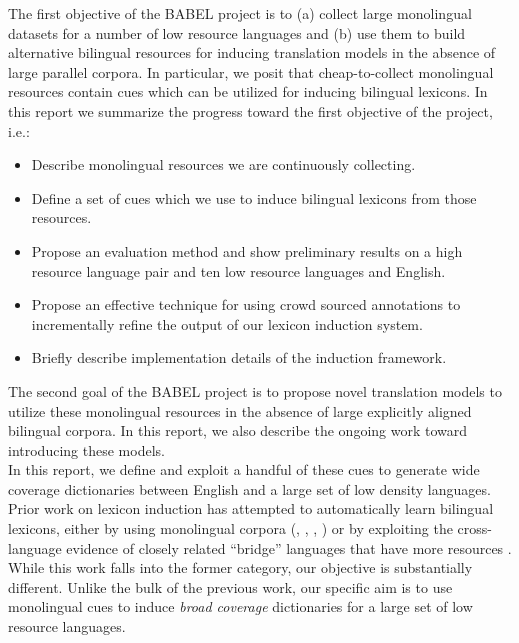 \documentclass{article}
\begin{document}
The first objective of the BABEL project is to (a) collect large monolingual datasets for a number of low resource languages and (b) use them to build alternative bilingual resources for inducing translation models in the absence of large parallel corpora.  In particular, we posit that cheap-to-collect monolingual resources contain cues which can be utilized for inducing bilingual lexicons. In this report we summarize the progress toward the first objective of the project, i.e.:

\begin{itemize}
 \item Describe monolingual resources we are continuously collecting.
 \item Define a set of cues which we use to induce bilingual lexicons from those resources.
 \item Propose an evaluation method and show preliminary results on a high resource language pair and ten low resource languages and English.
 \item Propose an effective technique for using crowd sourced annotations to incrementally refine the output of our lexicon induction system.
 \item Briefly describe implementation details of the induction framework.
\end{itemize}

The second goal of the BABEL project is to propose novel translation models to utilize these monolingual resources in the absence of large explicitly aligned bilingual corpora.  In this report, we also describe the ongoing work toward introducing these models.\\

In this report, we define and exploit a handful of these cues to generate wide coverage dictionaries between English and a large set of low density languages.  Prior work on lexicon induction has attempted to automatically learn bilingual lexicons, either by using monolingual corpora (\cite{Rapp:1999}, \cite{Koehn:2002}, \cite{Schafer:2002}, \cite{Haghighi:2008}) or by exploiting the cross-language evidence of closely related “bridge” languages that have more resources \cite{Mann:2001}.  While this work falls into the former category, our objective is substantially different.  Unlike the bulk of the previous work, our specific aim is to use monolingual cues to induce {\em broad coverage} dictionaries for a large set of low resource languages. 
\end{document}
